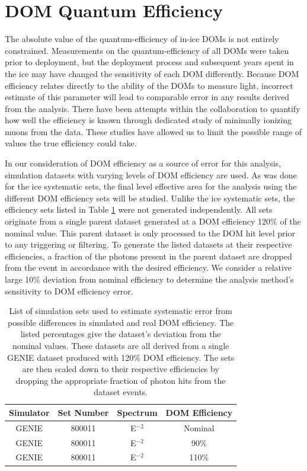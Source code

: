 \documentclass{gatech-thesis}
\begin{document}
\section{DOM Quantum Efficiency}
The absolute value of the quantum-efficiency of in-ice DOMs is not entirely constrained. Measurements on the quantum-efficiency of all DOMs were taken prior to deployment, but the deployment process and subsequent years spent in the ice may have changed the sensitivity of each DOM differently. Because DOM efficiency relates directly to the ability of the DOMs to measure light, incorrect estimate of this parameter will lead to comparable error in any results derived from the analysis. There have been attempts within the collaboration to quantify how well the efficiency is known through dedicated study of minimally ionizing muons from the data. These studies have allowed us to limit the possible range of values the true efficiency could take.

In our consideration of DOM efficiency as a source of error for this analysis, simulation datasets with varying levels of DOM efficiency are used. As was done for the ice systematic sets, the final level effective area for the analysis using the different DOM efficiency sets will be studied. Unlike the ice systematic sets, the efficiency sets listed in Table \ref{tab:eff_sets} were not generated independently. All sets originate from a single parent dataset generated at a DOM efficiency 120$\%$ of the nominal value. This parent dataset is only processed to the DOM hit level prior to any triggering or filtering. To generate the listed datasets at their respective efficiencies, a fraction of the photons present in the parent dataset are dropped from the event in accordance with the desired efficiency. We consider a relative large 10$\%$ deviation from nominal efficiency to determine the analysis method's sensitivity to DOM efficiency error.

\begin{table}[h]
\caption[DOM Efficiency Systematic Datasets]{List of simulation sets used to estimate systematic error from possible differences in simulated and real DOM efficiency. The listed percentages give the dataset's deviation from the nominal values. These datasets are all derived from a single GENIE dataset produced with 120$\%$ DOM efficiency. The sets are then scaled down to their respective efficiencies by dropping the appropriate fraction of photon hits from the dataset events.\label{tab:eff_sets}}
\begin{center}
\begin{tabular}{cccc}
\toprule
\textbf{Simulator} & \textbf{Set Number} &\textbf{Spectrum} & \textbf{DOM Efficiency} \\
\midrule
GENIE & 800011 & E$^{-2}$ & Nominal  \\
GENIE & 800011 & E$^{-2}$ & 90$\%$ \\
GENIE & 800011 & E$^{-2}$ & 110$\%$ \\
\hline
\end{tabular}
\end{center}
\end{table}
\end{document}
